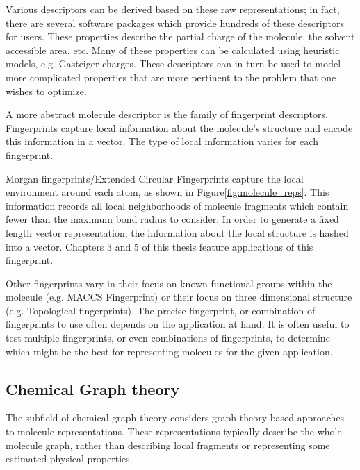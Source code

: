 Various descriptors can be derived based on these raw representations; in fact, there are several software packages which provide hundreds of these descriptors for users\cite{rdkit,mauri2006dragon}. These properties describe the partial charge of the molecule, the solvent accessible area, etc. Many of these properties can be calculated using heuristic models, e.g. Gasteiger charges. These descriptors can in turn be used to model more complicated properties that are more pertinent to the problem that one wishes to optimize\cite{mauri2006dragon}.

A more abstract molecule descriptor is the family of fingerprint descriptors. Fingerprints capture local information about the molecule's structure and encode this information in a vector. The type of local information varies for each fingerprint. 

Morgan fingerprints/Extended Circular Fingerprints \cite{morgan1965generation,Rogers_2010_ECFP} capture the local environment around each atom, as shown in Figure\ref{fig:molecule_reps}. This information records all local neighborhoods of molecule fragments which contain fewer than the maximum bond radius to consider. In order to generate a fixed length vector representation, the information about the local structure is hashed into a vector. Chapters 3 and 5 of this thesis feature applications of this fingerprint.


Other fingerprints vary in their focus on known functional groups within the molecule (e.g. MACCS Fingerprint)\cite{durant2002reoptimization} or their focus on three dimensional structure (e.g. Topological fingerprints)\cite{nilakantan1987topological}. The precise fingerprint, or combination of fingerprints to use often depends on the application at hand. It is often useful to test multiple fingerprints, or even combinations of fingerprints, to determine which might be the best for representing molecules for the given application\cite{kim2017multidk}.


\subsection{Chemical Graph theory}

The subfield of chemical graph theory considers graph-theory based approaches to molecule representations\cite{randic2016solved}. These representations typically describe the whole molecule graph, rather than describing local fragments or representing some estimated physical properties.

